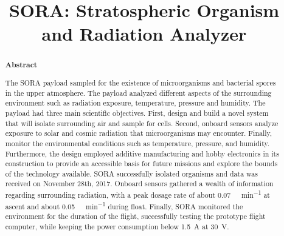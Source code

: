 \documentclass[aps,superscriptaddress,floatfix,nofootinbib,showpacs,amsmath,amssymb,altaffilletter,floatfix,onecolumn]{revtex4-1}
\begin{document}
\title{SORA: Stratospheric Organism and Radiation Analyzer}

\begin{abstract}
\begin{center}
{\bf Abstract}
\end{center}
The SORA payload sampled for the existence of microorganisms and bacterial spores in the upper atmosphere. The payload analyzed different aspects of the surrounding environment such as radiation exposure, temperature, pressure and humidity. The payload had three main scientific objectives. First, design and build a novel system that will isolate surrounding air and sample for cells. Second, onboard sensors analyze exposure to solar and cosmic radiation that microorganisms may encounter. Finally, monitor the environmental conditions such as temperature, pressure, and humidity. Furthermore, the design employed additive manufacturing and hobby electronics in its construction to provide an accessible basis for future missions and explore the bounds of the technology available.  SORA successfully isolated organisms and data was received on November 28th, 2017.  Onboard sensors gathered a wealth of information regarding surrounding radiation, with a peak dosage rate of about \SI{0.07}{\micro\Gray\per\minute} at ascent and about \SI{0.05}{\micro\Gray\per\minute} during float. Finally, SORA monitored the environment for the duration of the flight, successfully testing the prototype flight computer, while keeping the power consumption below \SI{1.5}{\ampere} at \SI{30}{\volt}.
\newpage %
\end{abstract}

\setlength{\parindent}{1em}
\setdefaultleftmargin{1em}{1em}{}{}{}{}
\setcounter{page}{0}\thispagestyle{empty}
\maketitle
\onecolumngrid
\setcounter{tocdepth}{2}
\setcounter{page}{0}\thispagestyle{empty}
\tableofcontents
\setcounter{page}{0}\thispagestyle{empty}
\newpage
\onecolumngrid %





\end{document}
